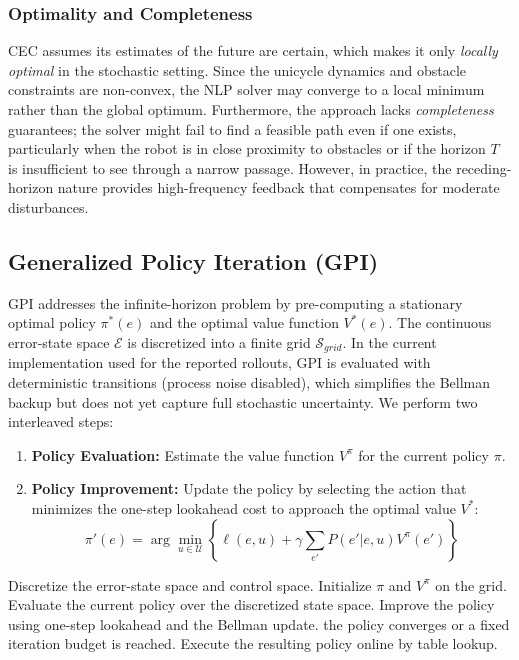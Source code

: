 \documentclass[conference]{IEEEtran}
\begin{document}
\subsubsection{Optimality and Completeness}
CEC assumes its estimates of the future are certain, which makes it only \textit{locally optimal} in the stochastic setting. Since the unicycle dynamics and obstacle constraints are non-convex, the NLP solver may converge to a local minimum rather than the global optimum. Furthermore, the approach lacks \textit{completeness} guarantees; the solver might fail to find a feasible path even if one exists, particularly when the robot is in close proximity to obstacles or if the horizon $T$ is insufficient to see through a narrow passage. However, in practice, the receding-horizon nature provides high-frequency feedback that compensates for moderate disturbances.

\subsection{Generalized Policy Iteration (GPI)}
GPI addresses the infinite-horizon problem by pre-computing a stationary optimal policy $\pi^*(e)$ and the optimal value function $V^*(e)$. The continuous error-state space $\mathcal{E}$ is discretized into a finite grid $\mathcal{S}_{grid}$. In the current implementation used for the reported rollouts, GPI is evaluated with deterministic transitions (process noise disabled), which simplifies the Bellman backup but does not yet capture full stochastic uncertainty. We perform two interleaved steps:
\begin{enumerate}
    \item \textbf{Policy Evaluation:} Estimate the value function $V^\pi$ for the current policy $\pi$.
    \item \textbf{Policy Improvement:} Update the policy by selecting the action that minimizes the one-step lookahead cost to approach the optimal value $V^*$:
    \begin{equation}
        \pi'(e) = \arg\min_{u \in \mathcal{U}} \left\{ \ell(e, u) + \gamma \sum_{e'} P(e'|e, u) V^\pi(e') \right\}
    \end{equation}
\end{enumerate}

\begin{algorithm}[H]
\caption{Offline GPI for Periodic Tracking}
\begin{algorithmic}[1]
\STATE Discretize the error-state space and control space.
\STATE Initialize $\pi$ and $V^\pi$ on the grid.
\REPEAT
\STATE Evaluate the current policy over the discretized state space.
\STATE Improve the policy using one-step lookahead and the Bellman update.
\UNTIL the policy converges or a fixed iteration budget is reached.
\STATE Execute the resulting policy online by table lookup.
\end{algorithmic}
\end{algorithm}
\end{document}
